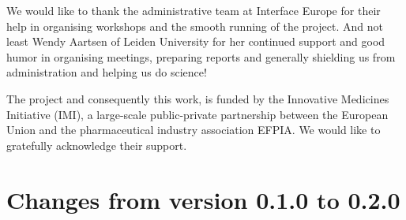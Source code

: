 We would like to thank the administrative team at Interface
Europe for their help in organising workshops and the smooth running
of the \ddmore project. And not least Wendy Aartsen of Leiden
University for her continued support and good humor in organising
meetings, preparing reports and generally shielding us from
administration and helping us do science!

The \ddmore project and consequently this work, is funded by the
Innovative Medicines Initiative (IMI), a large-scale public-private
partnership between the European Union and the pharmaceutical industry
association EFPIA\@. We would like to gratefully acknowledge their
support.


\section{Changes from version 0.1.0 to 0.2.0}

